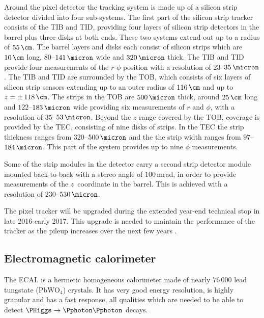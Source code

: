Around the pixel detector the tracking system is made up of a silicon
strip detector divided into four sub-systems. The first part of the
silicon strip tracker consists of the \ac{TIB} and \ac{TID}, providing four layers of
silicon strip detectors in the barrel plus three disks at both ends. These two systems
extend out up to a radius of $55\,\cm$. The barrel layers and disks each consist
of silicon strips which are $10\,\cm$ long, $80$--$141\,\micron$ wide and $320\,\micron$ thick. The \ac{TIB} and \ac{TID}
provide four measurements of the $r$-$\phi$ position with a resolution of $23$--$35\,\micron$. 
The \ac{TIB} and \ac{TID} are surrounded by the \ac{TOB}, which consists of six layers of silicon strip sensors extending
up to an outer radius of $116\,\cm$ and up to $z=\pm\,118\,\cm$. The strips in the \ac{TOB} are $500\,\micron$ thick, 
around $25\,\cm$ long and $122$--$183\,\micron$ 
wide providing six measurements of $r$ and $\phi$, with a resolution
of $35$--$53\,\micron$. Beyond the $z$ range covered by the \ac{TOB}, coverage is provided by the \ac{TEC},
consisting of nine disks of strips. In the \ac{TEC} the strip thickness ranges from $320$--$500\,\micron$ and 
the the strip width ranges from $97$--$184\,\micron$. %
This part of the system provides up to nine $\phi$ measurements.

Some of the strip modules in the detector carry a second strip detector module mounted back-to-back with a stereo angle %
of $100\,$mrad, in order to provide measurements of the \mbox{$z$ coordinate} in the barrel. This is achieved with a resolution of $230$--$530\,\micron$.

The pixel tracker will be upgraded during the extended year-end technical stop in late 2016-early 2017. This upgrade is needed to
maintain the performance of the tracker as the pileup increases over the next few years \cite{cms-pixel-upgrade}. %

\subsection{Electromagnetic calorimeter}
\label{sec:CMSLHC_CMS_ecal}
The \ac{ECAL} \cite{cms-jinst} is a hermetic homogeneous calorimeter
made of nearly $76\,000$ lead tungstate (PbWO$_4$) crystals. It has very
good energy resolution, is highly granular and has a fast response, all qualities 
which are needed to be able to detect $\PHiggs\rightarrow \Pphoton\Pphoton$ decays.

